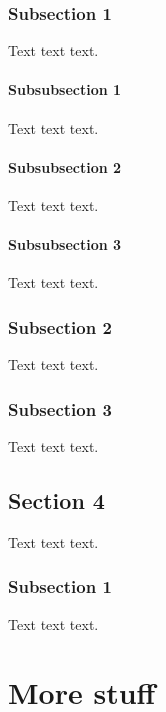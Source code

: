 \documentclass[twoside, titlepage]{amsbook}
\theoremstyle{plain} %
\theoremstyle{definition}
\theoremstyle{remark}
\theoremstyle{notation}
\begin{document}
			\subsection{Subsection 1}
			
				Text text text.
				
				\subsubsection{Subsubsection 1}
				
					Text text text.
				
				\subsubsection{Subsubsection 2}
				
					Text text text.
				
				\subsubsection{Subsubsection 3}
				
					Text text text.
			
			\subsection{Subsection 2}
			
				Text text text.
			
			\subsection{Subsection 3}
			
				Text text text.
		
		\section{Section 4}
		
			Text text text.
			
			\subsection{Subsection 1}
			
				Text text text.
	
	\chapter{More stuff}
	
\end{document}

